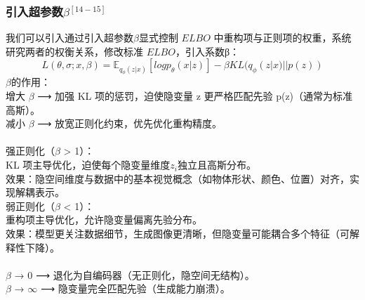 \documentclass[final]{ws-ijseke}
\begin{document}
\subsubsection{引入超参数$\beta$$^{[14-15]}$}
\hspace*{2em} 我们可以引入通过引入超参数$\beta$显式控制 $ELBO$ 中重构项与正则项的权重，系统研究两者的权衡关系，修改标准 $ELBO$，引入系数β：
\begin{equation*}
    L(\theta,\sigma;x,\beta) = \mathbb{E}_{q_\phi(z|x)}[logp_\theta(x|z)]-\beta KL(q_\phi(z|x)||p(z))
\end{equation*}
$\beta$的作用：\\
增大 $\beta$ ⟶ 加强 KL 项的惩罚，迫使隐变量 z 更严格匹配先验 p(z)（通常为标准高斯）。\\
减小 $\beta$ ⟶ 放宽正则化约束，优先优化重构精度。\\\\
强正则化（$\beta$ > 1）：\\
\hspace*{2em} KL 项主导优化，迫使每个隐变量维度$z_i$独立且高斯分布。\\
\hspace*{2em} 效果：隐空间维度与数据中的基本视觉概念（如物体形状、颜色、位置）对齐，实现解耦表示。\\
弱正则化（$\beta$ < 1）：\\
\hspace*{2em} 重构项主导优化，允许隐变量偏离先验分布。\\
\hspace*{2em} 效果：模型更关注数据细节，生成图像更清晰，但隐变量可能耦合多个特征（可解释性下降）。\\\\
$\beta$ → 0 ⟶ 退化为自编码器（无正则化，隐空间无结构）。\\
$\beta$ → $\infty$ ⟶ 隐变量完全匹配先验（生成能力崩溃）。\\
\end{document}
